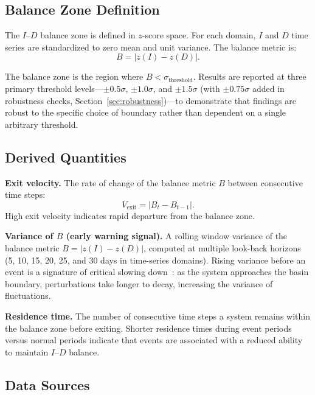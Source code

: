 \documentclass[aip,cha,reprint,amsmath,amssymb,final]{revtex4-2}
\begin{document}
\subsection{Balance Zone Definition}

The $I$--$D$ balance zone is defined in $z$-score space. For each domain, $I$ and $D$ time series are standardized to zero mean and unit variance. The balance metric is:
\begin{equation}
B = |z(I) - z(D)|.
\end{equation}

The balance zone is the region where $B < \sigma_{\text{threshold}}$. Results are reported at three primary threshold levels---$\pm 0.5\sigma$, $\pm 1.0\sigma$, and $\pm 1.5\sigma$ (with $\pm 0.75\sigma$ added in robustness checks, Section~\ref{sec:robustness})---to demonstrate that findings are robust to the specific choice of boundary rather than dependent on a single arbitrary threshold.

\subsection{Derived Quantities}

\textbf{Exit velocity.} The rate of change of the balance metric $B$ between consecutive time steps:
\begin{equation}
V_{\text{exit}} = |B_t - B_{t-1}|.
\end{equation}
High exit velocity indicates rapid departure from the balance zone.

\textbf{Variance of $B$ (early warning signal).} A rolling window variance of the balance metric $B = |z(I) - z(D)|$, computed at multiple look-back horizons (5, 10, 15, 20, 25, and 30 days in time-series domains). Rising variance before an event is a signature of critical slowing down~\cite{scheffer2009,dakos2012}: as the system approaches the basin boundary, perturbations take longer to decay, increasing the variance of fluctuations.

\textbf{Residence time.} The number of consecutive time steps a system remains within the balance zone before exiting. Shorter residence times during event periods versus normal periods indicate that events are associated with a reduced ability to maintain $I$--$D$ balance.

\subsection{Data Sources}
\end{document}
